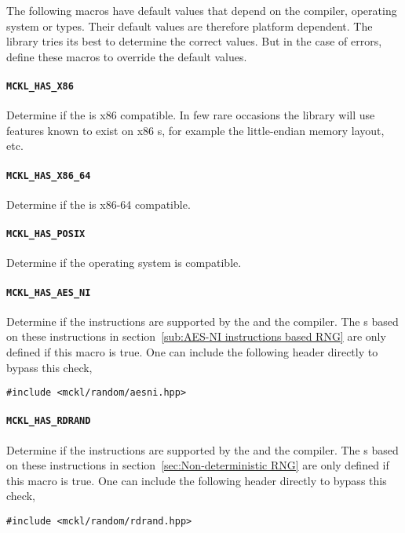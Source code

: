 The following macros have default values that depend on the compiler, operating
system or \cpu types. Their default values are therefore platform dependent.
The library tries its best to determine the correct values. But in the case of
errors, define these macros to override the default values.

\paragraph{\texttt{MCKL\_HAS\_X86}} Determine if the \cpu is x86 compatible. In
few rare occasions the library will use features known to exist on x86 \cpu{}s,
for example the little-endian memory layout, etc.

\paragraph{\texttt{MCKL\_HAS\_X86\_64}} Determine if the \cpu is x86-64
compatible.

\paragraph{\texttt{MCKL\_HAS\_POSIX}} Determine if the operating system is
\posix compatible.

\paragraph{\texttt{MCKL\_HAS\_AES\_NI}} Determine if the \aesni instructions
are supported by the \cpu and the compiler. The \rng{}s based on these
instructions in section~\ref{sub:AES-NI instructions based RNG} are only
defined if this macro is true. One can include the following header directly to
bypass this check,
\begin{verbatim}
#include <mckl/random/aesni.hpp>
\end{verbatim}

\paragraph{\texttt{MCKL\_HAS\_RDRAND}} Determine if the \rdrand instructions
are supported by the \cpu and the compiler. The \rng{}s based on these
instructions in section~\ref{sec:Non-deterministic RNG} are only defined if
this macro is true. One can include the following header directly to bypass
this check,
\begin{verbatim}
#include <mckl/random/rdrand.hpp>
\end{verbatim}

